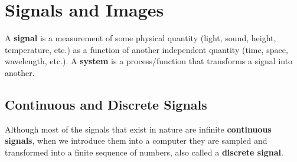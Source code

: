 



\section{Signals and Images}

A {\bf signal} is a measurement of some physical quantity (light, sound, height, temperature, etc.) as a function of another independent quantity (time, space, wavelength, etc.). A {\bf system} is a process/function that transforms a signal into another. 





\subsection{Continuous and Discrete Signals}


Although most of the signals that exist in nature are infinite {\bf continuous signals}, 
when we introduce them into a computer they are sampled and transformed into a finite sequence of numbers, also called a {\bf discrete signal}. 

